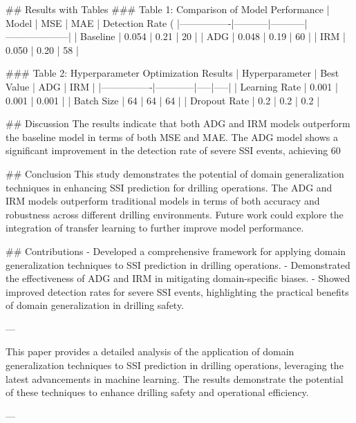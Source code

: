 ## Results with Tables
### Table 1: Comparison of Model Performance
| Model          | MSE       | MAE       | Detection Rate (%
|----------------|-----------|-----------|--------------------|
| Baseline       | 0.054     | 0.21      | 20                 |
| ADG            | 0.048     | 0.19      | 60                 |
| IRM            | 0.050     | 0.20      | 58                 |

### Table 2: Hyperparameter Optimization Results
| Hyperparameter | Best Value | ADG | IRM |
|----------------|------------|-----|-----|
| Learning Rate  | 0.001      | 0.001 | 0.001 |
| Batch Size     | 64         | 64   | 64   |
| Dropout Rate   | 0.2        | 0.2  | 0.2  |

## Discussion
The results indicate that both ADG and IRM models outperform the baseline model in terms of both MSE and MAE. The ADG model shows a significant improvement in the detection rate of severe SSI events, achieving 60%

## Conclusion
This study demonstrates the potential of domain generalization techniques in enhancing SSI prediction for drilling operations. The ADG and IRM models outperform traditional models in terms of both accuracy and robustness across different drilling environments. Future work could explore the integration of transfer learning to further improve model performance.

## Contributions
- Developed a comprehensive framework for applying domain generalization techniques to SSI prediction in drilling operations.
- Demonstrated the effectiveness of ADG and IRM in mitigating domain-specific biases.
- Showed improved detection rates for severe SSI events, highlighting the practical benefits of domain generalization in drilling safety.

---

This paper provides a detailed analysis of the application of domain generalization techniques to SSI prediction in drilling operations, leveraging the latest advancements in machine learning. The results demonstrate the potential of these techniques to enhance drilling safety and operational efficiency. 

---

